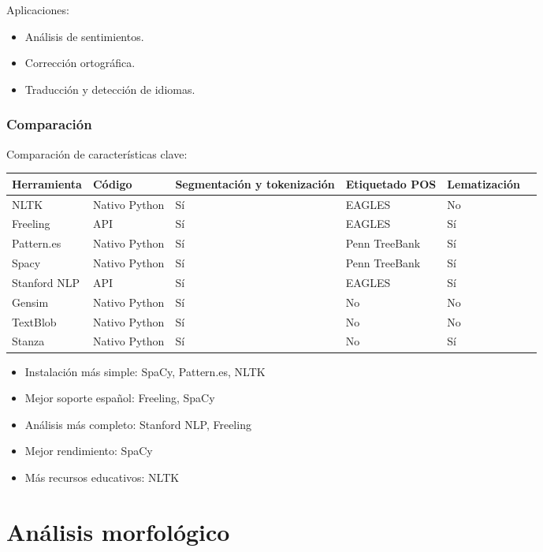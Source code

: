 \documentclass{report}
\def\profundidadIndiceCapitulo{subsubsection}
\begin{document}
Aplicaciones:

\begin{itemize}
    \item Análisis de sentimientos.
    \item Corrección ortográfica.
    \item Traducción y detección de idiomas.
\end{itemize}

\subsection{Comparación}
Comparación de características clave:

\begin{tabularx}{\linewidth}{|X|X|X|X|X|X|} 
\hline
Herramienta & Código & Segmentación y \newline tokenización & Etiquetado POS & Lematización \\ 
\hline 
NLTK & Nativo Python & Sí & EAGLES & No \\ 
\hline
Freeling & API & Sí & EAGLES & Sí \\
\hline
Pattern.es & Nativo Python & Sí & Penn TreeBank & Sí \\
\hline
Spacy & Nativo Python & Sí & Penn TreeBank & Sí \\
\hline
Stanford NLP & API & Sí & EAGLES & Sí \\
\hline
Gensim & Nativo Python & Sí & No & No\\
\hline
TextBlob & Nativo Python & Sí & No & No \\
\hline
Stanza & Nativo Python & Sí & No & Sí \\
\hline 
\end{tabularx}





\begin{itemize}
    \item Instalación más simple: SpaCy, Pattern.es, NLTK
    \item Mejor soporte español: Freeling, SpaCy
    \item Análisis más completo: Stanford NLP, Freeling
    \item Mejor rendimiento: SpaCy
    \item Más recursos educativos: NLTK
\end{itemize}


\chapter{Análisis morfológico}
\etocframedstyle[1]{}
\etocsetnexttocdepth{\profundidadIndiceCapitulo}
\localtableofcontents
\clearpage
\end{document}
